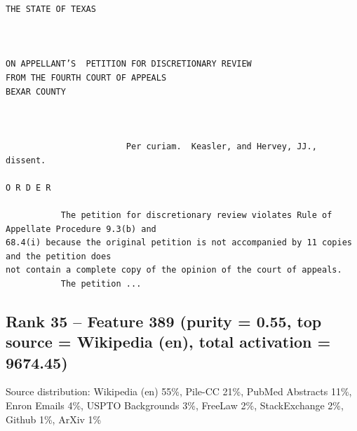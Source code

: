 \begin{verbatim}
THE STATE OF TEXAS



ON APPELLANT’S  PETITION FOR DISCRETIONARY REVIEW
FROM THE FOURTH COURT OF APPEALS
BEXAR COUNTY



                        Per curiam.  Keasler, and Hervey, JJ., dissent.

O R D E R 

           The petition for discretionary review violates Rule of Appellate Procedure 9.3(b) and
68.4(i) because the original petition is not accompanied by 11 copies and the petition does
not contain a complete copy of the opinion of the court of appeals.
           The petition ...

\end{verbatim}

\subsection*{Rank 35 -- Feature 389 (purity = 0.55, top source = Wikipedia (en), total activation = 9674.45)}

Source distribution: Wikipedia (en) 55\%, Pile-CC 21\%, PubMed Abstracts 11\%, Enron Emails 4\%, USPTO Backgrounds 3\%, FreeLaw 2\%, StackExchange 2\%, Github 1\%, ArXiv 1\%

